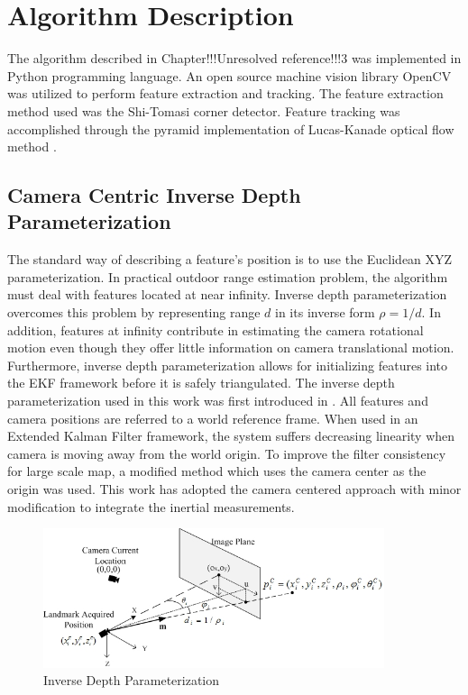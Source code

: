 \chapter{Algorithm Description}

The algorithm described in Chapter!!!Unresolved reference!!!3 was 
implemented in Python programming language. An open source machine 
vision library OpenCV was utilized to perform feature extraction and 
tracking. The feature extraction method used was the Shi-Tomasi corner 
detector. Feature tracking was accomplished through the pyramid 
implementation of Lucas-Kanade optical flow method . 

\section{Camera Centric Inverse Depth Parameterization}
The standard way of describing a feature's position is to use the 
Euclidean XYZ parameterization. In practical outdoor range estimation 
problem, the algorithm must deal with features located at near infinity. 
Inverse depth parameterization overcomes this problem by representing 
range $d$ in its inverse form $\rho =1/d$. In addition, features at 
infinity contribute in estimating the camera rotational motion even 
though they offer little information on camera translational motion. 
Furthermore, inverse depth parameterization allows for initializing 
features into the EKF framework before it is safely triangulated. 
The inverse depth parameterization used in this work was first
introduced in \cite{civera_inverse_2008}. All features and camera
positions are referred to a world reference frame. When used in an
Extended Kalman Filter framework, the system suffers decreasing
linearity when camera is moving away from the world origin.
To improve the filter consistency for large scale map, a modified
method which uses the camera center as the origin \cite{civera_1-point_2009} 
was used. This work has adopted the camera centered
approach with minor modification to integrate the inertial
measurements.

\begin{figure}[h]
\centering
\includegraphics[width=10cm, keepaspectratio=true]{./Figures/idp.jpg}
\caption{Inverse Depth Parameterization}
\label{fig:algo1}
\end{figure}


